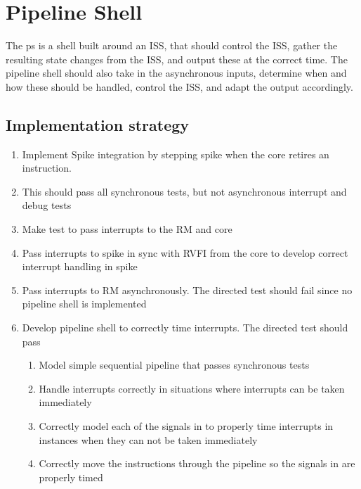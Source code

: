 \chapter{Pipeline Shell}
\label{ch:PipelineShell}


The \gls{ps} is a shell built around an ISS, that should control the ISS, gather the resulting state changes from the ISS, and output these at the correct time. The pipeline shell should also take in the asynchronous inputs, determine when and how these should be handled, control the ISS, and adapt the output accordingly. 

\section{Implementation strategy}

\begin{enumerate}
    \item Implement Spike integration by stepping spike when the core retires an instruction.
    \item This should pass all synchronous tests, but not asynchronous interrupt and debug tests
    \item Make test to pass interrupts to the RM and core
    \item Pass interrupts to spike in sync with RVFI from the core to develop correct interrupt handling in spike
    \item Pass interrupts to RM asynchronously. The directed test should fail since no pipeline shell is implemented
    \item Develop pipeline shell to correctly time interrupts. The directed test should pass
    \begin{enumerate}
        \item Model simple sequential pipeline that passes synchronous tests
        \item Handle interrupts correctly in situations where interrupts can be taken immediately
        \item Correctly model each of the signals in  to properly time interrupts in instances when they can not be taken immediately
        \item Correctly move the instructions through the pipeline so the signals in  are properly timed
    \end{enumerate}
\end{enumerate}

